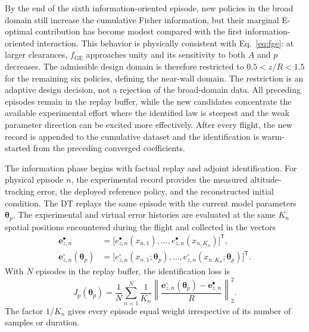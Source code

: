 \documentclass[journal]{IEEEtran}
\begin{document}
By the end of the sixth information-oriented episode, new policies in the broad domain still increase the cumulative Fisher information, but their marginal E-optimal contribution has become modest compared with the first information-oriented interaction. This behavior is physically consistent with Eq.~\eqref{eq:fge}: at larger clearances, $f_{\mathrm{GE}}$ approaches unity and its sensitivity to both $A$ and $p$ decreases. The admissible design domain is therefore restricted to $0.5<z/R<1.5$ for the remaining six policies, defining the near-wall domain. The restriction is an adaptive design decision, not a rejection of the broad-domain data. All preceding episodes remain in the replay buffer, while the new candidates concentrate the available experimental effort where the identified law is steepest and the weak parameter direction can be excited more effectively. After every flight, the new record is appended to the cumulative dataset and the identification is warm-started from the preceding converged coefficients.

The information phase begins with factual replay and adjoint identification. For physical episode $n$, the experimental record provides the measured altitude-tracking error, the deployed reference policy, and the reconstructed initial condition. The DT replays the same episode with the current model parameters $\boldsymbol{\theta}_p$. The experimental and virtual error histories are evaluated at the same $K_n$ spatial positions encountered during the flight and collected in the vectors
\begin{align}
 \mathbf e_{z,n}^{\bullet}
 &=\bigl[e_{z,n}^{\bullet}(x_{n,1}),\ldots,
 e_{z,n}^{\bullet}(x_{n,K_n})\bigr]^{\mathsf T},\\
 \mathbf e_{z,n}^{\circ}(\boldsymbol{\theta}_p)
 &=\bigl[e_{z,n}^{\circ}(x_{n,1};\boldsymbol{\theta}_p),\ldots,
 e_{z,n}^{\circ}(x_{n,K_n};\boldsymbol{\theta}_p)\bigr]^{\mathsf T}.
 \label{eq:episode-error-vectors}
\end{align}
With $N$ episodes in the replay buffer, the identification loss is
\begin{equation}
 J_p(\boldsymbol{\theta}_p)=
 \frac{1}{N}\sum_{n=1}^{N}
 \frac{1}{K_n}
 \left\|
 \frac{\mathbf e_{z,n}^{\circ}(\boldsymbol{\theta}_p)
       -\mathbf e_{z,n}^{\bullet}}{R}
 \right\|_2^2.
 \label{eq:identification-loss}
\end{equation}
The factor $1/K_n$ gives every episode equal weight irrespective of its number of samples or duration.
\end{document}
